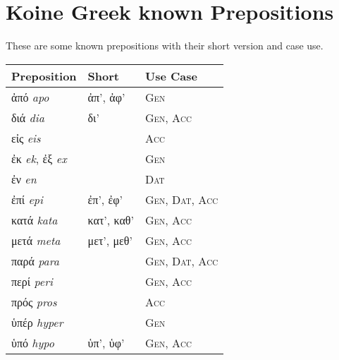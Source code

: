 \documentclass[10pt]{memoir}
\newcommand{\tsc}[1]{\textsc{#1}}
\newcommand{\grc}[1]{\fontspec{Inter}#1}
\newcommand{\trc}[1]{\textit{\fontspec{Tinos}#1}}
\begin{document}
    \section*{Koine Greek known Prepositions}
    These are some known prepositions with their short version and case use.

    \begin{table}[H]
        \begin{tabular}{lll}
            \textbf{Preposition} & \textbf{Short} & \textbf{Use Case} \\
            \hline
            \grc{ἀπό} \trc{apo} & \grc{ἀπ'}, \grc{ἀφ'} & \tsc{Gen} \\
            \grc{διά} \trc{dia} & \grc{δι'} & \tsc{Gen}, \tsc{Acc} \\
            \grc{εἰς} \trc{eis} &  & \tsc{Acc} \\
            \grc{ἐκ} \trc{ek}, \grc{ἐξ} \trc{ex} &  & \tsc{Gen} \\
            \grc{ἐν} \trc{en} &  & \tsc{Dat} \\
            \grc{ἐπί} \trc{epi} & \grc{ἐπ'}, \grc{ἐφ'} & \tsc{Gen}, \tsc{Dat}, \tsc{Acc} \\
            \grc{κατά} \trc{kata} & \grc{κατ'}, \grc{καθ'} & \tsc{Gen}, \tsc{Acc} \\
            \grc{μετά} \trc{meta} & \grc{μετ'}, \grc{μεθ'} & \tsc{Gen}, \tsc{Acc} \\
            \grc{παρά} \trc{para} &  & \tsc{Gen}, \tsc{Dat}, \tsc{Acc} \\
            \grc{περί} \trc{peri} &  & \tsc{Gen}, \tsc{Acc} \\
            \grc{πρός} \trc{pros} &  & \tsc{Acc} \\
            \grc{ὑπέρ} \trc{hyper} &  & \tsc{Gen} \\
            \grc{ὑπό} \trc{hypo} & \grc{ὑπ'}, \grc{ὑφ'} & \tsc{Gen}, \tsc{Acc} \\
        \end{tabular}
    \end{table}
    \nopagebreak
\end{document}
